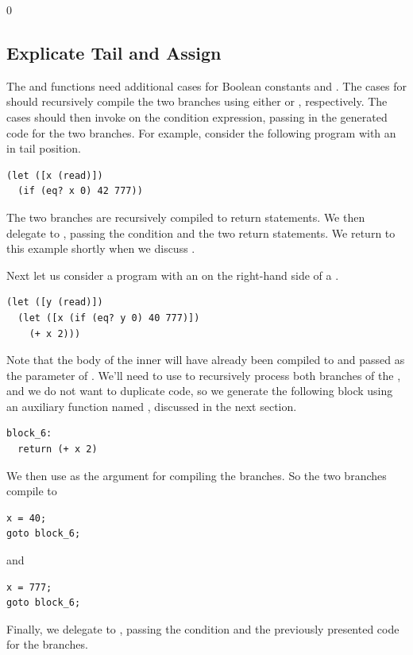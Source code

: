 \documentclass[7x10]{TimesAPriori_MIT}%
\def\racketEd{0}
\providecommand{\BookEdition}{1}
\let\edition\BookEdition
\numberwithin{theorem}{chapter}
\numberwithin{definition}{chapter}
\numberwithin{equation}{chapter}
\begin{document}
{\if\edition\racketEd

\subsection{Explicate Tail and Assign}
  
The  and  functions need
additional cases for Boolean constants and .  The cases for
 should recursively compile the two branches using either
 or , respectively. The
cases should then invoke  on the condition
expression, passing in the generated code for the two branches.  For
example, consider the following program with an  in tail
position.
\begin{lstlisting}
(let ([x (read)])
  (if (eq? x 0) 42 777))
\end{lstlisting}
The two branches are recursively compiled to return statements.  We
then delegate to , passing the condition
 and the two return statements.  We return to this
example shortly when we discuss .

Next let us consider a program with an  on the right-hand
side of a .
\begin{lstlisting}
(let ([y (read)])
  (let ([x (if (eq? y 0) 40 777)])
    (+ x 2)))
\end{lstlisting}
Note that the body of the inner  will have already been
compiled to  and passed as the 
parameter of . We'll need to use 
to recursively process both branches of the , and we do not
want to duplicate code, so we generate the following block using an
auxiliary function named , discussed in the next
section.
\begin{lstlisting}
block_6:
  return (+ x 2)
\end{lstlisting}
We then use  as the  argument for
compiling the branches. So the two branches compile to
\begin{center}
\begin{minipage}{0.2\textwidth}
\begin{lstlisting}
x = 40;
goto block_6;
\end{lstlisting}
\end{minipage}
\hspace{0.5in} and \hspace{0.5in}
\begin{minipage}{0.2\textwidth}
\begin{lstlisting}
x = 777;
goto block_6;
\end{lstlisting}
\end{minipage}
\end{center}
Finally, we delegate to , passing the condition
 and the previously presented code for the branches.

}
\end{document}
